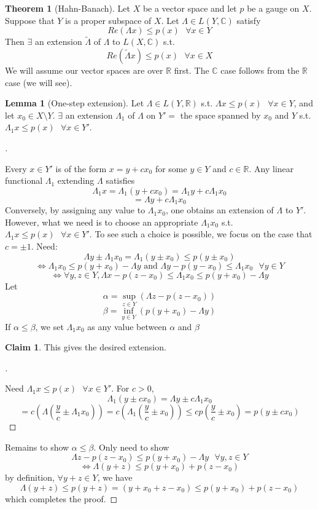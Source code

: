 \documentclass{article}
\newcommand{\sfa}{\text{  } \forall}
\theoremstyle{definition}
\newtheorem{thm}{Theorem}
\newtheorem{lem}{Lemma}
\newtheorem*{clm}{Claim}
\newenvironment{proofs}[1][\proofname]{%
  \begin{proof}[#1]$ $\par\nobreak\ignorespaces
}{%
  \end{proof}
}
\begin{document}
\begin{thm}[Hahn-Banach]
	Let $X$ be a vector space and let $p$ be a gauge on $X$. 
	Suppose that $Y$ is a proper subspace of $X$.
	Let $\Lambda \in L(Y, \mathbb{C})$ satisfy
	\[
		Re(\Lambda x) \leq p(x) \sfa x \in Y
	\]
	Then $\exists$ an extension $\tilde{\Lambda}$ of $\Lambda$ to $L(X, \mathbb{C})$ s.t.
	\[
		Re(\tilde{\Lambda} x) \leq p(x) \sfa x \in X
	\]
	We will assume our vector spaces are over $\mathbb{R}$ first.
	The $\mathbb{C}$ case follows from the $\mathbb{R}$ case (we will see).
\end{thm}

\begin{lem}[One-step extension]
	Let $\Lambda \in L(Y, \mathbb{R})$ s.t. $\Lambda x \leq p(x) \sfa x \in Y$, and let $x_0 \in X \setminus Y$. $\exists$ an extension $\Lambda_1$ of $\Lambda$ on $Y' =$ the space spanned by $x_0$ and $Y$ s.t. $\Lambda_1 x \leq p(x) \sfa x \in Y'$.
\end{lem}

\begin{proofs}
	Every $x \in Y'$ is of the form $x = y + c x_0$ for some $y \in Y$ and $c \in \mathbb{R}$. Any linear functional $\Lambda_1$ extending $\Lambda$ satisfies
	\[
		\Lambda_1 x = \Lambda_1 (y + c x_0) = \Lambda_1 y + c \Lambda_1 x_0
	\]
	\[
		= \Lambda y + c \Lambda_1 x_0
	\]
	Conversely, by assigning any value to $\Lambda_1 x_0$, one obtains an extension of $\Lambda$ to $Y'$. However, what we need is to choose an appropriate $\Lambda_1 x_0$ s.t. $\Lambda_1 x \leq p(x) \sfa x \in Y'$. To see such a choice is possible, we focus on the case that $c = \pm 1$.
	Need:
	\[
		\Lambda y \pm \Lambda_1 x_0 = \Lambda_1(y \pm x_0) \leq p(y \pm x_0) 
	\]
	\[
		\Leftrightarrow \Lambda_1 x_0 \leq p(y + x_0) - \Lambda y \text{ and } \Lambda y - p(y - x_0) \leq \Lambda_1 x_0 \sfa y \in Y
	\]
	\[
		\Leftrightarrow \forall y, z \in Y, \Lambda x - p(z - x_0) \leq \Lambda_1 x_0 \leq p(y + x_0) - \Lambda y
	\]
	Let 
	\[
		\alpha = \sup_{z \in Y} (\Lambda z - p(z - x_0))
	\]
	\[
		\beta = \inf_{y \in Y} (p(y + x_0) - \Lambda y)
	\]
	If $\alpha \leq \beta$, we set $\Lambda_1 x_0$ as any value between $\alpha$ and $\beta$
	\begin{clm}
		This gives the desired extension.
	\end{clm}

	\begin{proofs}
		Need $\Lambda_1 x \leq p(x) \sfa x \in Y'$.
		For $c > 0$, 
		\[
			\Lambda_1 (y \pm c x_0) = \Lambda y \pm c \Lambda_1x_0
		\]
		\[
			= c\left( \Lambda \left(\frac{y}{c} \pm \Lambda_1 x_0 \right) \right) = c\left(\Lambda_1 \left(\frac{y}{c} \pm x_0\right) \right) \leq c p\left(\frac{y}{c} \pm x_0\right) = p(y \pm c x_0)
		\]
	\end{proofs}
	Remains to show $\alpha \leq \beta$.
	Only need to show 
	\[
		\Lambda z - p(z - x_0) \leq p(y + x_0) - \Lambda y \sfa y, z \in Y
	\]
	\[
		\Leftrightarrow \Lambda (y + z) \leq p (y + x_0) + p(z - x_0)
	\]
	by definition, $\forall y + z \in Y$, we have
	\[
		\Lambda (y + z) \leq p (y + z) = (y + x_0 + z - x_0) \leq p(y + x_0) + p(z - x_0)
	\]
	which completes the proof. 

\end{proofs}
\end{document}
